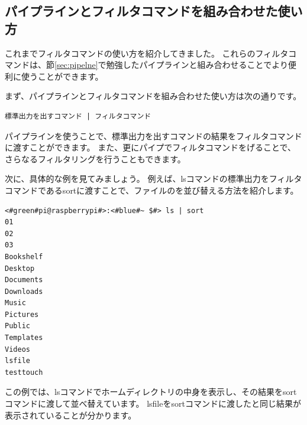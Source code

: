 \documentclass[text03.tex]{subfiles}
\begin{document}
\subsection{パイプラインとフィルタコマンドを組み合わせた使い方}
これまでフィルタコマンドの使い方を紹介してきました。
これらのフィルタコマンドは、節\ref{sec:pipelne}で勉強したパイプラインと組み合わせることでより便利に使うことができます。

まず、パイプラインとフィルタコマンドを組み合わせた使い方は次の通りです。

\begin{lstlisting}[caption=パイプラインを用いたフィルタコマンドの実行例, label=pipeline_filter]
標準出力を出すコマンド | フィルタコマンド
\end{lstlisting}

パイプラインを使うことで、標準出力を出すコマンドの結果をフィルタコマンドに渡すことができます。
また、更にパイプでフィルタコマンドをげることで、さらなるフィルタリングを行うこともできます。

次に、具体的な例を見てみましょう。
例えば、lsコマンドの標準出力をフィルタコマンドであるsortに渡すことで、ファイルのを並び替える方法を紹介します。

\begin{lstlisting}[caption=パイプラインを用いたsortコマンドの実行例, label=sort_example]
<#green#pi@raspberrypi#>:<#blue#~ $#> ls | sort
01
02
03
Bookshelf
Desktop
Documents
Downloads
Music
Pictures
Public
Templates
Videos
lsfile
testtouch
\end{lstlisting}

この例では、lsコマンドでホームディレクトリの中身を表示し、その結果をsortコマンドに渡して並べ替えています。
lsfileをsortコマンドに渡したと同じ結果が表示されていることが分かります。
\end{document}
